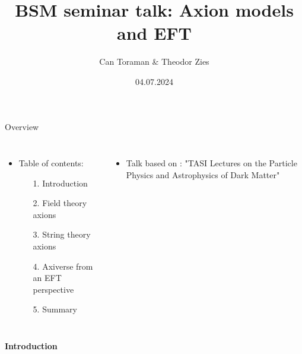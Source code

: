 \documentclass[aspectratio=1610, 9pt]{beamer}
\title{BSM seminar talk: Axion models and EFT}
\author{Can Toraman \& Theodor Zies}
\date{04.07.2024}
\institute[Department of physics]{Supervision: Prof. Dr. Gudrun Hiller}
\begin{document}
\begin{frame}
\titlepage
\end{frame}

\begin{frame}{Overview}
  \begin{columns}
    \column{\textwidth}
    \begin{itemize}
      \item Table of contents:
      \begin{itemize}
        \item [1.] Introduction
        \item [2.] Field theory axions
        \item [3.] String theory axions
        \item [4.] Axiverse from an EFT perspective
        \item [5.] Summary
      \end{itemize}
    \end{itemize}
    \begin{itemize}
      \item Talk based on : "TASI Lectures on the Particle Physics and Astrophysics of Dark Matter"
    \end{itemize}
  \end{columns} 
\end{frame}

\begin{frame}[noframenumbering]
  \centering
  \Huge \textbf{\textcolor{tugreen}{Introduction}}
\end{frame}
\end{document}
